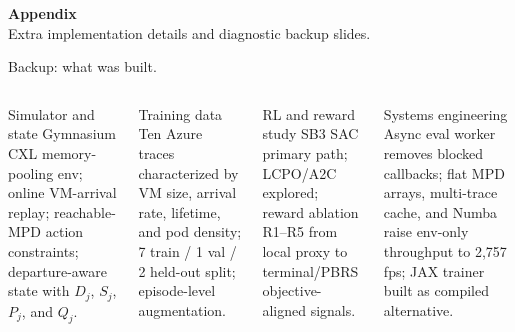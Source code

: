 \documentclass[11pt,aspectratio=43]{beamer}
\begin{document}

\appendix

\begin{frame}[plain]
  \vfill
  \begin{center}
    {\Large\bfseries Appendix}\\[0.8em]
    \small Extra implementation details and diagnostic backup slides.
  \end{center}
  \vfill
\end{frame}

\begin{frame}[shrink=5]{Backup: what was built.}

  \begin{columns}[T,onlytextwidth]

      \begin{block}{Simulator and state}
        \small
        Gymnasium CXL memory-pooling env; online VM-arrival replay; reachable-MPD
        action constraints; departure-aware state with $D_j$, $S_j$, $P_j$, and $Q_j$.
      \end{block}

      \vspace{0.45em}
      \begin{block}{Training data}
        \small
        Ten Azure traces characterized by VM size, arrival rate, lifetime, and pod
        density; 7 train / 1 val / 2 held-out split; episode-level augmentation.
      \end{block}

      \begin{block}{RL and reward study}
        \small
        SB3 SAC primary path; LCPO/A2C explored; reward ablation R1--R5 from
        local proxy to terminal/PBRS objective-aligned signals.
      \end{block}

      \vspace{0.45em}
      \begin{block}{Systems engineering}
        \small
        Async eval worker removes blocked callbacks; flat MPD arrays, multi-trace
        cache, and Numba raise env-only throughput to 2{,}757 fps; JAX trainer
        built as compiled alternative.
      \end{block}

  \end{columns}

\end{frame}
\end{document}
